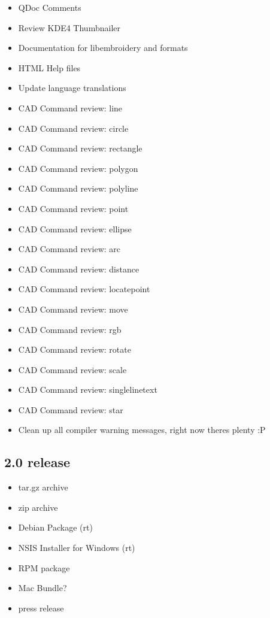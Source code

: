\documentclass[10pt]{report}
\begin{document}
\begin{itemize}
\item QDoc Comments
\item Review KDE4 Thumbnailer
\item Documentation for libembroidery and formats
\item HTML Help files
\item Update language translations
\item CAD Command review: line
\item CAD Command review: circle
\item CAD Command review: rectangle
\item CAD Command review: polygon
\item CAD Command review: polyline
\item CAD Command review: point
\item CAD Command review: ellipse
\item CAD Command review: arc
\item CAD Command review: distance
\item CAD Command review: locatepoint
\item CAD Command review: move
\item CAD Command review: rgb
\item CAD Command review: rotate
\item CAD Command review: scale
\item CAD Command review: singlelinetext
\item CAD Command review: star
\item Clean up all compiler warning messages, right now theres plenty :P
\end{itemize}

\subsection{2.0 release}

\begin{itemize}
\item tar.gz archive
\item zip archive
\item Debian Package (rt)
\item NSIS Installer for Windows (rt)
\item RPM package
\item Mac Bundle?
\item press release
\end{itemize}
\end{document}
